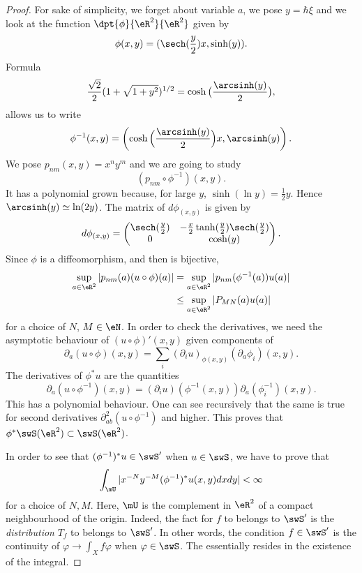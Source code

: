 \begin{proof}
	For sake of simplicity, we forget about variable $a$, we pose $y=\hbar \xi$ and we look at the function $\dpt{\phi}{\eR^2}{\eR^2}$ given by
	\[
		\phi(x,y)=(\sech(\frac{y}{2})x,\sinh(y)).
	\]
	Formula
	\[
		\frac{\sqrt{2}}{2}(1+\sqrt{1+y^2})^{1/2}=\cosh\big( \frac{\arcsinh(y)}{2} \big),
	\]
	allows us to write
	\begin{equation}
		\phi^{-1}(x,y)=\left( \cosh\Big( \frac{\arcsinh(y)}{2} \Big)x,\arcsinh(y) \right).
	\end{equation}
	We pose $p_{nm}(x,y)=x^ny^m$ and we are going to study
	\[
		(p_{nm}\circ\phi^{-1})(x,y).
	\]
	It has a polynomial grown because, for large $y$, $\sinh(\ln y)=\frac{1}{2} y$. Hence $\arcsinh(y)\simeq \ln(2 y)$. The matrix of $d\phi_{(x,y)}$ is given by
	\begin{equation}
		d\phi_{(x,y)}=
		\begin{pmatrix}
			\sech(\frac{y}{2}) & -\frac{x}{2}\tanh(\frac{y}{2})\sech(\frac{y}{2}) \\
			0                  & \cosh(y)
		\end{pmatrix}.
	\end{equation}
	Since $\phi$ is a diffeomorphism, and then is bijective,
	\begin{equation}
		\begin{split}
			\sup_{a\in\eR^2}| p_{nm}(a)(u\circ \phi)(a) |&=\sup_{a\in\eR^2}| p_{nm}(\phi^{-1}(a))u(a) |\\
			&\leq \sup_{a\in\eR^2}| P_{MN}(a)u(a) |
		\end{split}
	\end{equation}
	for a choice of $N$, $M\in\eN$. In order to check the derivatives, we need the asymptotic behaviour of $(u\circ\phi)'(x,y)$ given components of
	\[
		\partial_a(u\circ\phi)(x,y)=\sum_i(\partial_iu)_{\phi(x,y)}(\partial_a\phi_i)(x,y).
	\]
	The derivatives of $\phi^*u$ are the quantities
	\[
		\partial_a(u\circ\phi^{-1})(x,y)=(\partial_iu)(\phi^{-1}(x,y))\partial_a(\phi_i^{-1})(x,y).
	\]
	This has a polynomial behaviour. One can see recursively that the same is true for second derivatives $\partial^2_{ab}(u\circ\phi^{-1})$ and higher. This proves that $\phi^*\swS(\eR^2)\subset\swS(\eR^2)$.

	In order to see that $(\phi^{-1})^*u\in\swS'$ when $u\in\swS$, we have to prove that
	\begin{equation} \label{eq:r1181205}
		\int_{\mU}| x^{-N}y^{-M}(\phi^{-1})^*u(x,y)dxdy |<\infty
	\end{equation}
	for a choice of $N,M$. Here, $\mU$ is the complement in $\eR^2$ of a compact neighbourhood of the origin. Indeed, the fact for $f$ to belongs to $\swS'$ is the \emph{distribution} $T_f$ to belongs to $\swS'$. In other words, the condition $f\in\swS'$ is the continuity of $\varphi\to\int_X f\varphi$ when $\varphi\in\swS$. The essentially resides in the existence of the integral.


\end{proof}
